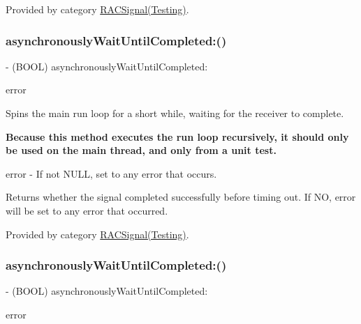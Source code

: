 Provided by category \mbox{\hyperlink{category_r_a_c_signal_07_testing_08_a29ac4be53792963e1c7e5c59e545e6cd}{R\+A\+C\+Signal(\+Testing)}}.

\mbox{\label{interface_r_a_c_signal_a29ac4be53792963e1c7e5c59e545e6cd}} 
\subsubsection{\texorpdfstring{asynchronously\+Wait\+Until\+Completed\+:()}{asynchronouslyWaitUntilCompleted:()}\hspace{0.1cm}{\footnotesize\ttfamily [2/3]}}
{\footnotesize\ttfamily -\/ (B\+O\+OL) asynchronously\+Wait\+Until\+Completed\+: \begin{DoxyParamCaption}\item[{(N\+S\+Error $\ast$$\ast$)}]{error }\end{DoxyParamCaption}}

Spins the main run loop for a short while, waiting for the receiver to complete.

{\bfseries Because this method executes the run loop recursively, it should only be used on the main thread, and only from a unit test.}

error -\/ If not N\+U\+LL, set to any error that occurs.

Returns whether the signal completed successfully before timing out. If NO, {\ttfamily error} will be set to any error that occurred. 

Provided by category \mbox{\hyperlink{category_r_a_c_signal_07_testing_08_a29ac4be53792963e1c7e5c59e545e6cd}{R\+A\+C\+Signal(\+Testing)}}.

\mbox{\label{interface_r_a_c_signal_a29ac4be53792963e1c7e5c59e545e6cd}} 
\subsubsection{\texorpdfstring{asynchronously\+Wait\+Until\+Completed\+:()}{asynchronouslyWaitUntilCompleted:()}\hspace{0.1cm}{\footnotesize\ttfamily [3/3]}}
{\footnotesize\ttfamily -\/ (B\+O\+OL) asynchronously\+Wait\+Until\+Completed\+: \begin{DoxyParamCaption}\item[{(N\+S\+Error $\ast$$\ast$)}]{error }\end{DoxyParamCaption}}


